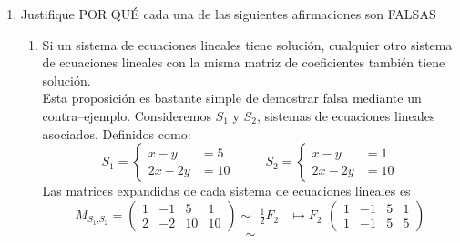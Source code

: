 \documentclass{article}
\begin{document}
\begin{enumerate}
    \item Justifique POR QUÉ cada una de las siguientes afirmaciones son FALSAS
        \begin{enumerate}[label=\listAlph]
			\item Si un sistema de ecuaciones lineales tiene solución, cualquier otro sistema de ecuaciones lineales con la misma matriz de coeficientes también tiene solución. \\
                Esta proposición es bastante simple de demostrar falsa mediante un contra--ejemplo.
                Consideremos \(S_1\) y \(S_2\), sistemas de ecuaciones lineales asociados. Definidos como:
                \[
                    S_1 =
                    \left\{
                        \begin{aligned}
                            x - y &= 5 \\
                            2x - 2y &= 10
                        \end{aligned}
                    \right.
                    \hspace{1cm}
                    S_2 =
                    \left\{
                        \begin{aligned}
                            x - y &= 1 \\
                            2x - 2y &= 10
                        \end{aligned}
                    \right.
                \]
                Las matrices expandidas de cada sistema de ecuaciones lineales es
                \[
                    M_{S_1\text{,}S_2} =
                    \left(
                    \begin{array}{cc|cc}
                        1 & -1 & 5  & 1 \\
                        2 & -2 & 10 & 10
                    \end{array}
                    \right)
                    \sim
                    \begin{aligned}
                        \frac{1}{2}F_2 &\mapsto F_2
                    \end{aligned}
                    \left(
                    \begin{array}{cc|cc}
                        1 & -1 & 5  & 1 \\
                        1 & -1 & 5  & 5
                    \end{array}
                    \right)
                \]
                \[
                    \sim
\]
\end{enumerate}
\end{enumerate}
\end{document}
